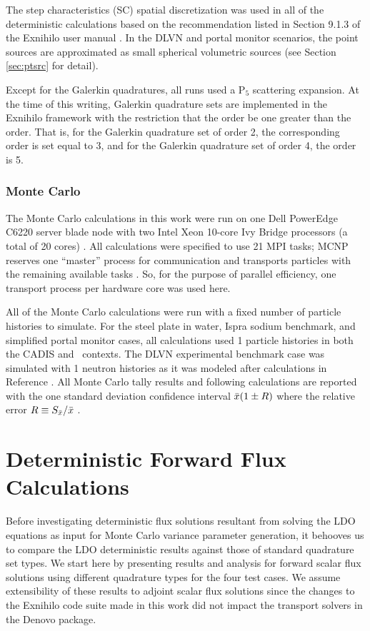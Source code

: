 The step characteristics (SC) spatial discretization was used in all of the
deterministic calculations based on the recommendation listed in Section 9.1.3 of the
Exnihilo user manual \cite{exum}. In the DLVN and portal monitor scenarios, the point
sources are approximated as small spherical volumetric sources (see Section 
\ref{sec:ptsrc} for detail).

Except for the Galerkin quadratures, all runs used a P$_5$ scattering expansion. At 
the time of this writing, Galerkin quadrature sets are implemented in the Exnihilo 
framework with the restriction that the \pn order be one greater than the \sn order.
That is, for the Galerkin quadrature set of \sn order 2, the corresponding \pn order 
is set equal to 3, and for the Galerkin quadrature set of \sn order 4, the \pn order
is 5.

\subsubsection{Monte Carlo}
\label{mcparams}

The Monte Carlo calculations in this work were run on one Dell PowerEdge C6220
server  blade node with two Intel Xeon 10-core Ivy Bridge processors (a total
of 20 cores) \cite{savio}. All calculations were specified to use 21 MPI
tasks; MCNP reserves one ``master'' process for communication and transports
particles with the remaining available tasks \cite{mcnp}. So, for the purpose
of parallel efficiency, one transport process per hardware core was used here.

All of the Monte Carlo calculations were run with a fixed number of particle 
histories to simulate. For the steel plate in water, Ispra sodium benchmark, and 
simplified portal monitor cases, all calculations used 1 particle histories in 
both the CADIS and \fwc\ contexts. The DLVN experimental benchmark case was simulated 
with 1 neutron histories as it was modeled after calculations in Reference 
\cite{sw-dlvn}. All Monte Carlo tally results and following calculations
are reported with the one standard deviation confidence interval $\bar{x}(1\pm R)$ where the
relative error $R \equiv S_{\bar{x}}/\bar{x}$ \cite{mcnp}.

\FloatBarrier
\section{Deterministic Forward Flux Calculations}
\label{sec:det-fwd}

Before investigating deterministic flux solutions resultant from solving the LDO
equations as input for Monte Carlo variance parameter generation, it behooves us to
compare the LDO deterministic results against those of standard quadrature set types.
We start here by presenting results and analysis for forward scalar flux solutions
using different quadrature types for the four test cases. We assume extensibility of
these results to adjoint scalar flux solutions since the changes to the Exnihilo code
suite made in this work did not impact the transport solvers in the Denovo package.

